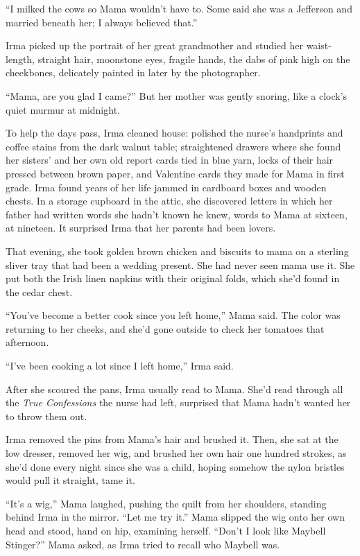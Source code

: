 \documentclass[
]{article}
\begin{document}
``I milked the cows so Mama wouldn't have to. Some said she was a
Jefferson and married beneath her; I always believed that.''

Irma picked up the portrait of her great grandmother and studied her
waist-length, straight hair, moonstone eyes, fragile hands, the dabs of
pink high on the cheekbones, delicately painted in later by the
photographer.

``Mama, are you glad I came?'' But her mother was gently snoring, like a
clock's quiet murmur at midnight.

To help the days pass, Irma cleaned house: polished the nurse's
handprints and coffee stains from the dark walnut table; straightened
drawers where she found her sisters' and her own old report cards tied
in blue yarn, locks of their hair pressed between brown paper, and
Valentine cards they made for Mama in first grade. Irma found years of
her life jammed in cardboard boxes and wooden chests. In a storage
cupboard in the attic, she discovered letters in which her father had
written words she hadn't known he knew, words to Mama at sixteen, at
nineteen. It surprised Irma that her parents had been lovers.

That evening, she took golden brown chicken and biscuits to mama on a
sterling sliver tray that had been a wedding present. She had never seen
mama use it. She put both the Irish linen napkins with their original
folds, which she'd found in the cedar chest.

``You've become a better cook since you left home,'' Mama said. The
color was returning to her cheeks, and she'd gone outside to check her
tomatoes that afternoon.

``I've been cooking a lot since I left home,'' Irma said.

After she scoured the pans, Irma usually read to Mama. She'd read
through all the \emph{True Confessions} the nurse had left, surprised
that Mama hadn't wanted her to throw them out.

Irma removed the pins from Mama's hair and brushed it. Then, she sat at
the low dresser, removed her wig, and brushed her own hair one hundred
strokes, as she'd done every night since she was a child, hoping somehow
the nylon bristles would pull it straight, tame it.

``It's a wig,'' Mama laughed, pushing the quilt from her shoulders,
standing behind Irma in the mirror. ``Let me try it.'' Mama slipped the
wig onto her own head and stood, hand on hip, examining herself. ``Don't
I look like Maybell Stinger?'' Mama asked, as Irma tried to recall who
Maybell was.
\end{document}
